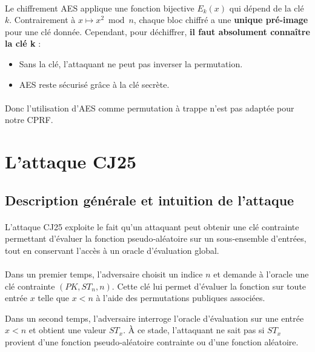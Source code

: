 \documentclass[9pt]{extarticle}
\begin{document}
\paragraph{}
Le chiffrement AES applique une fonction bijective \(E_k(x)\) qui dépend de la clé \(k\).
Contrairement à \(x \mapsto x^2 \bmod n\), chaque bloc chiffré a une \textbf{unique pré-image} pour une clé donnée.
Cependant, pour déchiffrer, \textbf{il faut absolument connaître la clé k} :
\begin{itemize}
    \item Sans la clé, l'attaquant ne peut pas inverser la permutation.
    \item AES reste sécurisé grâce à la clé secrète.
\end{itemize}

\paragraph{}
Donc l'utilisation d'AES comme permutation à trappe n'est pas adaptée pour notre CPRF.


\section{L'attaque CJ25}

\subsection{Description générale et intuition de l’attaque}

\paragraph{}
L’attaque CJ25 exploite le fait qu’un attaquant peut obtenir une clé contrainte
permettant d’évaluer la fonction pseudo‑aléatoire sur un sous‑ensemble d’entrées,
tout en conservant l’accès à un oracle d’évaluation global.

\paragraph{}
Dans un premier temps, l’adversaire choisit un indice $n$ et demande à l’oracle une
clé contrainte $(PK, ST_n, n)$. Cette clé lui permet d’évaluer la fonction sur toute
entrée $x$ telle que $x < n$ à l’aide des permutations publiques associées.

Dans un second temps, l’adversaire interroge l’oracle d’évaluation sur une entrée
$x < n$ et obtient une valeur $ST_x$. À ce stade, l’attaquant ne sait pas si $ST_x$
provient d’une fonction pseudo‑aléatoire contrainte ou d’une fonction aléatoire.
\end{document}
